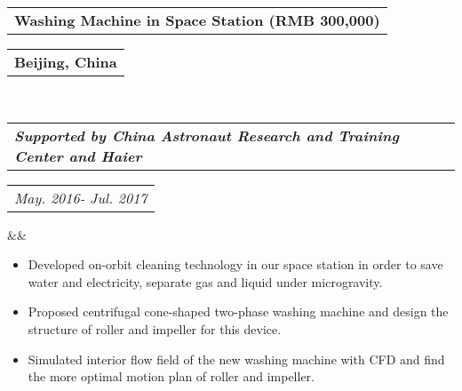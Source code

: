 \documentclass[11pt,a4paper,palatine]{moderncv}        %
\makeatletter
\newcommand*{\customcventry}[7][.25em]{
  \begin{tabular}{@{}l} 
    {\bfseries #4}
  \end{tabular}
  \hfill%
  \begin{tabular}{l@{}}
     {\bfseries #5}
  \end{tabular} \\
  \begin{tabular}{@{}l} 
    {\itshape #3}
  \end{tabular}
  \hfill%
  \begin{tabular}{l@{}}
     {\itshape #2}
  \end{tabular}
  \ifx&#7&%
  \else{\\%
    \begin{minipage}{\maincolumnwidth}%
      \small#7%
    \end{minipage}}\fi%
  \par\addvspace{#1}}
\newcommand*{\customcvproject}[4][.25em]{
  \begin{tabular}{@{}l} 
    {\bfseries #2}
  \end{tabular}
  \hfill%
  \begin{tabular}{l@{}}
     {\itshape #3}
  \end{tabular}
  \ifx&#4&%
  \else{\\%
    \begin{minipage}{\maincolumnwidth}%
      \small#4%
    \end{minipage}}\fi%
  \par\addvspace{#1}}
\makeatother
\begin{document}
\begin{CJK*}{UTF8}{gbsn}


{\customcventry{ May. 2016- Jul. 2017}{\textbf{Supported by China Astronaut Research and Training Center and Haier}}{Washing Machine in Space Station (RMB 300,000)}{Beijing, China}{}{}}
  {\begin{itemize}
    \item Developed on-orbit cleaning technology in our space station in order to save water and electricity, separate gas and liquid under microgravity.
    \item Proposed centrifugal cone-shaped two-phase washing machine and design the structure of roller and impeller for this device.
    \item Simulated interior flow field of the new washing machine with CFD and find the more optimal motion plan of roller and impeller.
  \end{itemize}
}

\setlength{\parskip}{0.5em}


\end{CJK*}
\end{document}

